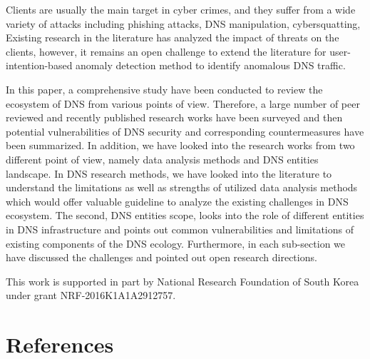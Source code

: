  Clients are usually the main target in cyber crimes, and they suffer from a wide variety of attacks including phishing attacks, DNS manipulation, cybersquatting, \etc Existing research in the literature has
analyzed the impact of threats on the clients, however, it remains an open challenge to extend the literature for user-intention-based anomaly detection method to identify anomalous DNS traffic.

\label{sec:Conclusion}
In this paper, a comprehensive study have been conducted to review the ecosystem of DNS from various points of view. Therefore, a large number of peer reviewed and recently published research works have been surveyed and then potential vulnerabilities of DNS security and corresponding countermeasures have been summarized. In addition, we have looked into the research works from two different point of view, namely data analysis methods and DNS entities landscape. In DNS research methods, we have looked into the literature to understand the limitations as well as strengths of utilized data analysis methods which would offer valuable guideline to analyze the existing challenges in DNS ecosystem. The second, DNS entities scope, looks into the role of different entities in DNS infrastructure and points out common vulnerabilities and limitations of existing components of the DNS ecology. Furthermore, in each sub-section we have discussed the challenges and pointed out open research directions.

This work is supported in part by National Research Foundation of South Korea under grant NRF-2016K1A1A2912757.
\section*{References}



